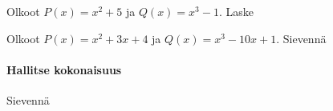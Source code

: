 \begin{tehtavasivu}
\begin{tehtava}
    Olkoot $P(x)=x^2+5$ ja $Q(x)=x^3-1$. Laske
    \begin{alakohdat}
    \end{alakohdat}
    \begin{vastaus}
        \begin{alakohdat}
        \end{alakohdat}
    \end{vastaus}
\end{tehtava}

\begin{tehtava}
    Olkoot $P(x)=x^2+3x+4$ ja $Q(x)=x^3-10x+1$. Sievennä
    \begin{alakohdat}
    \end{alakohdat}
    \begin{vastaus}
        \begin{alakohdat}
        \end{alakohdat}
    \end{vastaus}
\end{tehtava}

\paragraph*{Hallitse kokonaisuus}

\begin{tehtava}
    Sievennä
    \begin{alakohdat}
    \end{alakohdat}
    \begin{vastaus}
        \begin{alakohdat}
        \end{alakohdat}
    \end{vastaus}
\end{tehtava}


\end{tehtavasivu}
